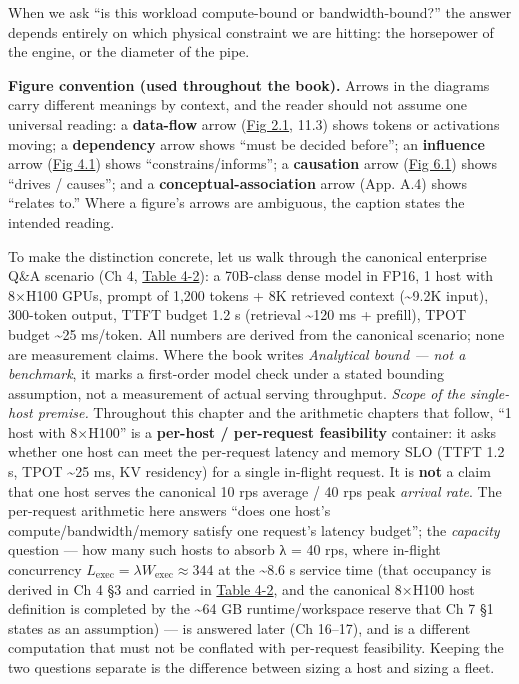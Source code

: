 When we ask ``is this workload compute-bound or bandwidth-bound?'' the
answer depends entirely on which physical constraint we are hitting: the
horsepower of the engine, or the diameter of the pipe.

\textbf{Figure convention (used throughout the book).} Arrows in the
diagrams carry different meanings by context, and the reader should not
assume one universal reading: a \textbf{data-flow} arrow (\hyperref[fig:2.1]{Fig 2.1}, 11.3)
shows tokens or activations moving; a \textbf{dependency} arrow shows
``must be decided before''; an \textbf{influence} arrow (\hyperref[fig:4.1]{Fig 4.1}) shows
``constrains/informs''; a \textbf{causation} arrow (\hyperref[fig:6.1]{Fig 6.1}) shows
``drives / causes''; and a \textbf{conceptual-association} arrow (App.
A.4) shows ``relates to.'' Where a figure's arrows are ambiguous, the
caption states the intended reading.

\label{worked-example}


To make the distinction concrete, let us walk through the canonical
enterprise Q\&A scenario (Ch 4, \hyperref[tab:4.2]{Table 4-2}): a 70B-class dense model in
FP16, 1 host with 8×H100 GPUs, prompt of 1,200 tokens + 8K retrieved
context (\textasciitilde9.2K input), 300-token output, TTFT budget 1.2 s
(retrieval \textasciitilde120 ms + prefill), TPOT budget
\textasciitilde25 ms/token. All numbers are derived from the canonical
scenario; none are measurement claims. Where the book writes
\emph{Analytical bound --- not a benchmark}, it marks a first-order
model check under a stated bounding assumption, not a measurement of
actual serving throughput. \emph{Scope of the single-host premise.}
Throughout this chapter and the arithmetic chapters that follow, ``1
host with 8×H100'' is a \textbf{per-host / per-request feasibility}
container: it asks whether one host can meet the per-request latency and
memory SLO (TTFT 1.2 s, TPOT \textasciitilde25 ms, KV residency) for a
single in-flight request. It is \textbf{not} a claim that one host
serves the canonical 10 rps average / 40 rps peak \emph{arrival rate}.
The per-request arithmetic here answers ``does one host's
compute/bandwidth/memory satisfy one request's latency budget''; the
\emph{capacity} question --- how many such hosts to absorb λ = 40 rps,
where in-flight concurrency
\(L_{\mathrm{exec}} = \lambda W_{\mathrm{exec}} \approx 344\) at the
\textasciitilde8.6 s service time (that occupancy is derived in Ch 4 §3
and carried in \hyperref[tab:4.2]{Table 4-2}, and the canonical 8×H100 host definition is
completed by the \textasciitilde64 GB runtime/workspace reserve that Ch
7 §1 states as an assumption) --- is answered later (Ch 16--17), and is
a different computation that must not be conflated with per-request
feasibility. Keeping the two questions separate is the difference
between sizing a host and sizing a fleet.


